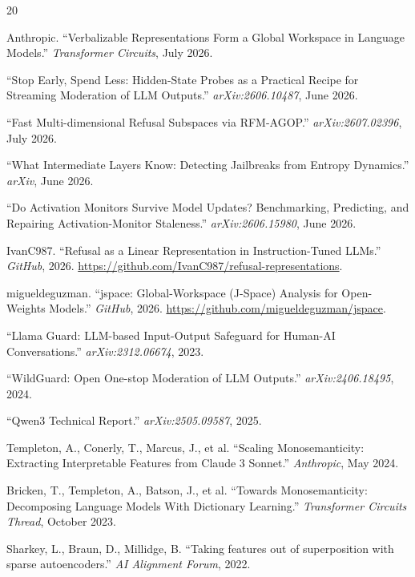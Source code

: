 \documentclass[11pt]{article}
\begin{document}
\begin{thebibliography}{20}

Anthropic. ``Verbalizable Representations Form a Global Workspace in Language Models.'' \emph{Transformer Circuits}, July 2026.

``Stop Early, Spend Less: Hidden-State Probes as a Practical Recipe for Streaming Moderation of LLM Outputs.'' \emph{arXiv:2606.10487}, June 2026.

``Fast Multi-dimensional Refusal Subspaces via RFM-AGOP.'' \emph{arXiv:2607.02396}, July 2026.

``What Intermediate Layers Know: Detecting Jailbreaks from Entropy Dynamics.'' \emph{arXiv}, June 2026.

``Do Activation Monitors Survive Model Updates? Benchmarking, Predicting, and Repairing Activation-Monitor Staleness.'' \emph{arXiv:2606.15980}, June 2026.

IvanC987. ``Refusal as a Linear Representation in Instruction-Tuned LLMs.'' \emph{GitHub}, 2026. \url{https://github.com/IvanC987/refusal-representations}.

migueldeguzman. ``jspace: Global-Workspace (J-Space) Analysis for Open-Weights Models.'' \emph{GitHub}, 2026. \url{https://github.com/migueldeguzman/jspace}.

``Llama Guard: LLM-based Input-Output Safeguard for Human-AI Conversations.'' \emph{arXiv:2312.06674}, 2023.

``WildGuard: Open One-stop Moderation of LLM Outputs.'' \emph{arXiv:2406.18495}, 2024.

``Qwen3 Technical Report.'' \emph{arXiv:2505.09587}, 2025.

Templeton, A., Conerly, T., Marcus, J., et al. ``Scaling Monosemanticity: Extracting Interpretable Features from Claude 3 Sonnet.'' \emph{Anthropic}, May 2024.

Bricken, T., Templeton, A., Batson, J., et al. ``Towards Monosemanticity: Decomposing Language Models With Dictionary Learning.'' \emph{Transformer Circuits Thread}, October 2023.

Sharkey, L., Braun, D., Millidge, B. ``Taking features out of superposition with sparse autoencoders.'' \emph{AI Alignment Forum}, 2022.


\end{thebibliography}
\end{document}
